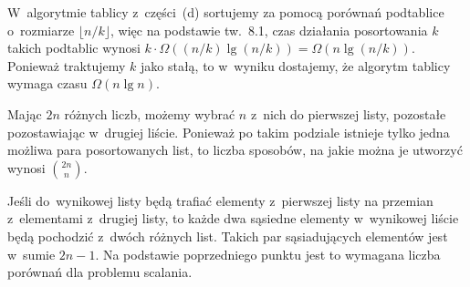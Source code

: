 \subproblem %
W~algorytmie  tablicy z~części~(d) sortujemy za pomocą porównań podtablice o~rozmiarze $\lfloor n/k\rfloor$, więc na podstawie tw.~8.1, czas działania posortowania $k$ takich podtablic wynosi $k\cdot\Omega((n/k)\lg(n/k))=\Omega(n\lg(n/k))$. Ponieważ traktujemy $k$ jako stałą, to w~wyniku dostajemy, że algorytm  tablicy  wymaga czasu $\Omega(n\lg n)$.


\subproblem %
Mając $2n$ różnych liczb, możemy wybrać $n$ z~nich do pierwszej listy, pozostałe pozostawiając w~drugiej liście. Ponieważ po takim podziale istnieje tylko jedna możliwa para posortowanych list, to liczba sposobów, na jakie można je utworzyć wynosi $\binom{2n}{n}$.

\subproblem %
\subproblem %

\subproblem %
Jeśli do~wynikowej listy będą trafiać elementy z~pierwszej listy na przemian z~elementami z~drugiej listy, to każde dwa sąsiedne elementy w~wynikowej liście będą pochodzić z~dwóch różnych list. Takich par sąsiadujących elementów jest w~sumie $2n-1$. Na podstawie poprzedniego punktu jest to wymagana liczba porównań dla problemu scalania.

\endinput
